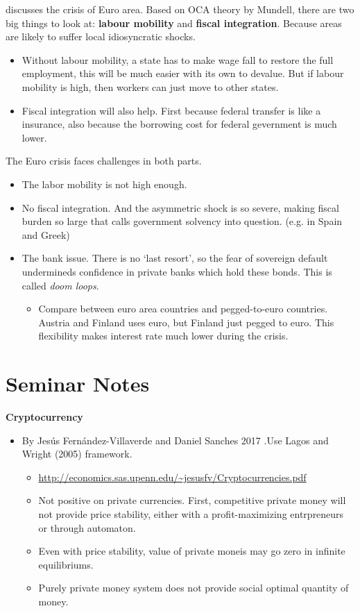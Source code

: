 \documentclass{book}
\theoremstyle{plain}
\theoremstyle{definition}
\begin{document}
\cite{Krugman:2012eu} discusses the crisis of Euro area. Based on OCA theory by Mundell, there are two big things to look at: \textbf{labour mobility} and \textbf{fiscal integration}. Because areas are likely to suffer local idiosyncratic shocks. 
\begin{itemize}
	\item Without labour mobility, a state has to make wage fall to restore the full employment, this will be much easier with its own to devalue. But if labour mobility is high, then workers can just move to other states.
	\item Fiscal integration will also help. First because federal transfer is like a insurance, also because the borrowing cost for federal gevernment is much lower.
\end{itemize}
The Euro crisis faces challenges in both parts.
\begin{itemize}
	\item The labor mobility is not high enough.
	\item No fiscal integration. And the asymmetric shock is so severe, making fiscal burden so large that calls government solvency into question. (e.g. in Spain and Greek)
	\item The bank issue. There is no `last resort', so the fear of sovereign default undermineds confidence in private banks which hold these bonds. This is called \textit{doom loops}.
	\begin{itemize}
		\item Compare between euro area countries and pegged-to-euro countries. Austria and Finland uses euro, but Finland just pegged to euro. This flexibility makes interest rate much lower during the crisis.
	\end{itemize}
\end{itemize}

\vspace{2mm}
\textbf{}


\section{Seminar Notes} %
\label{sec:seminar_notes}

\noindent
\textbf{Cryptocurrency}

\begin{itemize}
	\item By Jesús Fernández-Villaverde and Daniel	Sanches 2017
		.Use Lagos and Wright (2005) framework.
	\begin{itemize}
		\item \url{http://economics.sas.upenn.edu/~jesusfv/Cryptocurrencies.pdf}
		\item Not positive on private currencies. First, competitive private money will not provide price stability, either with a profit-maximizing entrpreneurs or through automaton.
		\item Even with price stability, value of private moneis may go zero in infinite equilibriums.
		\item Purely private money system does not provide social optimal quantity of money.
	\end{itemize}
\end{itemize}
\end{document}
